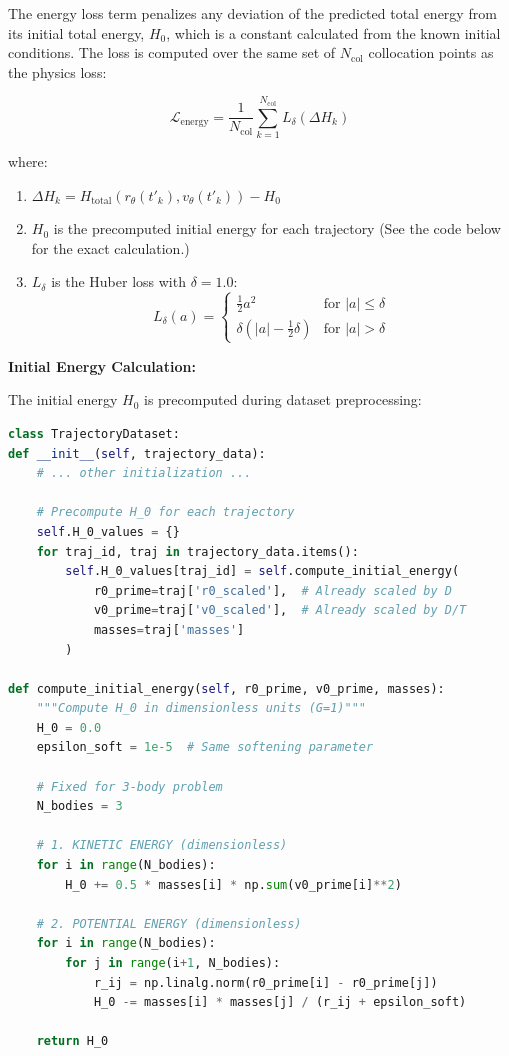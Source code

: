\documentclass{article}
\begin{document}
The energy loss term penalizes any deviation of the predicted total energy from its initial total energy, $H_0$, which is a constant calculated from the known initial conditions. The loss is computed over the same set of $N_{\text{col}}$ collocation points as the physics loss:

\[
\mathcal{L}_{\text{energy}} = \frac{1}{N_{\text{col}}} \sum_{k=1}^{N_{\text{col}}} L_\delta(\Delta H_k)
\]

where:

\begin{enumerate}
    \item $\Delta H_k = H_{\text{total}}(r_\theta(t'_k), v_\theta(t'_k)) - H_0$
    
    \item $H_0$ is the precomputed initial energy for each trajectory (See the code below for the exact calculation.)
    
    \item $L_\delta$ is the Huber loss with $\delta = 1.0$:
    \[
    L_\delta(a) =
    \begin{cases}
        \frac{1}{2} a^2 & \text{for } |a| \leq \delta \\
        \delta (|a| - \frac{1}{2} \delta) & \text{for } |a| > \delta
    \end{cases}
    \]
\end{enumerate}

\textbf{Initial Energy Calculation:}

The initial energy $H_0$ is precomputed during dataset preprocessing:

\begin{lstlisting}[language=Python, caption={Initial Energy Calculation in Dataset Preprocessing}]
class TrajectoryDataset:
def __init__(self, trajectory_data):
    # ... other initialization ...
    
    # Precompute H_0 for each trajectory
    self.H_0_values = {}
    for traj_id, traj in trajectory_data.items():
        self.H_0_values[traj_id] = self.compute_initial_energy(
            r0_prime=traj['r0_scaled'],  # Already scaled by D
            v0_prime=traj['v0_scaled'],  # Already scaled by D/T
            masses=traj['masses']
        )

def compute_initial_energy(self, r0_prime, v0_prime, masses):
    """Compute H_0 in dimensionless units (G=1)"""
    H_0 = 0.0
    epsilon_soft = 1e-5  # Same softening parameter
    
    # Fixed for 3-body problem
    N_bodies = 3
    
    # 1. KINETIC ENERGY (dimensionless)
    for i in range(N_bodies):
        H_0 += 0.5 * masses[i] * np.sum(v0_prime[i]**2)
    
    # 2. POTENTIAL ENERGY (dimensionless)
    for i in range(N_bodies):
        for j in range(i+1, N_bodies):
            r_ij = np.linalg.norm(r0_prime[i] - r0_prime[j])
            H_0 -= masses[i] * masses[j] / (r_ij + epsilon_soft)
            
    return H_0
\end{lstlisting}
\end{document}
